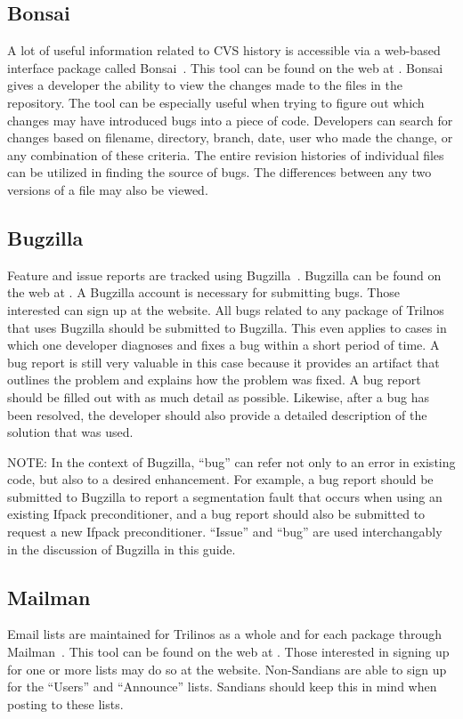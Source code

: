 \documentclass[12pt,strict]{TrilinosDevGuide}
\begin{document}
\subsection{Bonsai}
A lot of useful information related to CVS history is accessible via a
web-based interface package called Bonsai~\cite{Bonsai}.  This tool can be 
found on the web at 
\newline
{}.  Bonsai gives a 
developer the ability to view the changes made to the files in the 
repository.  The tool can be especially useful when trying to figure out which 
changes may have introduced bugs into a piece of code.  Developers can search 
for changes based on filename, directory, branch, date, user who made the 
change, or any combination of these criteria.  The entire revision histories of
individual files can be utilized in finding the source of 
bugs.  The differences between any two versions of a file may also be viewed.  

\subsection{Bugzilla}
\label{subsect:Bugzilla}
Feature and issue reports are tracked using Bugzilla~\cite{Bugzilla}.  
Bugzilla can be found on the web at 
.  
A Bugzilla account is necessary for submitting bugs.  Those interested can 
sign up at the website.  All bugs related to any package of Trilnos that uses 
Bugzilla should be submitted to Bugzilla.  This even applies to cases in which 
one developer diagnoses and fixes a bug within a short period of time.  A bug 
report is still very valuable in this case because it provides an artifact 
that outlines the problem and explains how the problem was fixed.  A bug 
report should be filled out with as much detail as possible.  Likewise, after 
a bug has been resolved, the developer should also provide a detailed 
description of the solution that was used.

NOTE: In the context of Bugzilla, ``bug'' can refer not only to an error in 
existing code, but also to a desired enhancement.  For example, a bug report 
should be submitted to Bugzilla to report a segmentation fault that occurs 
when using an existing Ifpack preconditioner, and a bug report should also be
submitted to request a new Ifpack preconditioner.  ``Issue'' and ``bug'' are 
used interchangably in the discussion of Bugzilla in this guide.

\subsection{Mailman}
\label{subsect:MailMan}
Email lists are maintained for Trilinos as a whole and for each package 
through Mailman~\cite{Mailman}.  This tool can be found on the web at 
\newline
{}.  
Those interested in signing 
up for one or more lists may do so at the website.  Non-Sandians are able to 
sign up for the ``Users'' and ``Announce'' lists.  Sandians should keep this 
in mind when posting to these lists.
\end{document}
